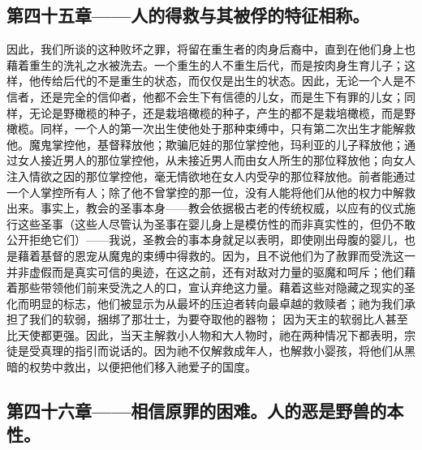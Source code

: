
\subsection{第四十五章——人的得救与其被俘的特征相称。}

因此，我们所谈的这种败坏之罪，将留在重生者的肉身后裔中，直到在他们身上也藉着重生的洗礼之水被洗去。一个重生的人不重生后代，而是按肉身生育儿子；这样，他传给后代的不是重生的状态，而仅仅是出生的状态。因此，无论一个人是不信者，还是完全的信仰者，他都不会生下有信德的儿女，而是生下有罪的儿女；同样，无论是野橄榄的种子，还是栽培橄榄的种子，产生的都不是栽培橄榄，而是野橄榄。同样，一个人的第一次出生使他处于那种束缚中，只有第二次出生才能解救他。魔鬼掌控他，基督释放他；欺骗厄娃的那位掌控他，玛利亚的儿子释放他；通过女人接近男人的那位掌控他，从未接近男人而由女人所生的那位释放他；向女人注入情欲之因的那位掌控他，毫无情欲地在女人内受孕的那位释放他。前者能通过一个人掌控所有人；除了他不曾掌控的那一位，没有人能将他们从他的权力中解救出来。事实上，教会的圣事本身——教会依据极古老的传统权威，以应有的仪式施行这些圣事（这些人尽管认为圣事在婴儿身上是模仿性的而非真实性的，但仍不敢公开拒绝它们）——我说，圣教会的事本身就足以表明，即使刚出母腹的婴儿，也是藉着基督的恩宠从魔鬼的束缚中得救的。因为，且不说他们为了赦罪而受洗这一并非虚假而是真实可信的奥迹，在这之前，还有对敌对力量的驱魔和呵斥；他们藉着那些带领他们前来受洗之人的口，宣认弃绝这力量。藉着这些对隐藏之现实的圣化而明显的标志，他们被显示为从最坏的压迫者转向最卓越的救赎者；祂为我们承担了我们的软弱，捆绑了那壮士，为要夺取他的器物； 因为天主的软弱比人甚至比天使都更强。因此，当天主解救小人物和大人物时，祂在两种情况下都表明，宗徒是受真理的指引而说话的。因为祂不仅解救成年人，也解救小婴孩，将他们从黑暗的权势中救出，以便把他们移入祂爱子的国度。\par


\subsection{第四十六章——相信原罪的困难。人的恶是野兽的本性。}

